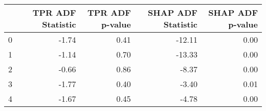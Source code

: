 \begin{tabular}{lrrrr}
\toprule
 & TPR ADF Statistic & TPR ADF p-value & SHAP ADF Statistic & SHAP ADF p-value \\
\midrule
0 & -1.74 & 0.41 & -12.11 & 0.00 \\
1 & -1.14 & 0.70 & -13.33 & 0.00 \\
2 & -0.66 & 0.86 & -8.37 & 0.00 \\
3 & -1.77 & 0.40 & -3.40 & 0.01 \\
4 & -1.67 & 0.45 & -4.78 & 0.00 \\
\bottomrule
\end{tabular}
